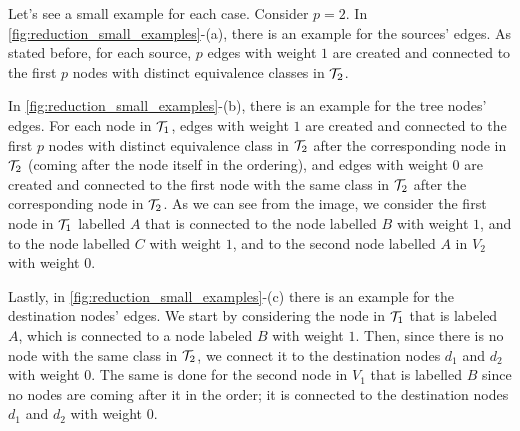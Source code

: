 \begin{example}[Edges]
    Let's see a small example for each case. Consider $p=2$. In \cref{fig:reduction_small_examples}-(a), there is an example for the sources' edges. As stated before, for each source, $p$ edges with weight $1$ are created and connected to the first $p$ nodes with distinct equivalence classes in $\mathcal{T}_{2}$.

    In \cref{fig:reduction_small_examples}-(b), there is an example for the tree nodes' edges. For each node in $\mathcal{T}_{1}$, edges with weight $1$ are created and connected to the first $p$ nodes with distinct equivalence class in $\mathcal{T}_{2}$ after the corresponding node in $\mathcal{T}_{2}$ (coming after the node itself in the ordering), and edges with weight $0$ are created and connected to the first node with the same class in $\mathcal{T}_{2}$ after the corresponding node in $\mathcal{T}_{2}$. As we can see from the image, we consider the first node in $\mathcal{T}_{1}$ labelled $A$ that is connected to the node labelled $B$ with weight $1$, and to the node labelled $C$ with weight $1$, and to the second node labelled $A$ in $V_2$ with weight $0$.

    Lastly, in \cref{fig:reduction_small_examples}-(c) there is an example for the destination nodes' edges. We start by considering the node in $\mathcal{T}_{1}$ that is labeled $A$, which is connected to a node labeled $B$ with weight $1$. Then, since there is no node with the same class in $\mathcal{T}_{2}$, we connect it to the destination nodes $d_1$ and $d_2$ with weight $0$. The same is done for the second node in $V_1$ that is labelled $B$ since no nodes are coming after it in the order; it is connected to the destination nodes $d_1$ and $d_2$ with weight $0$.

    \begin{figure}[H]
        \centering
        \begin{subfigure}[b]{0.3\textwidth}
            \centering
\end{subfigure}
\end{figure}
\end{example}
